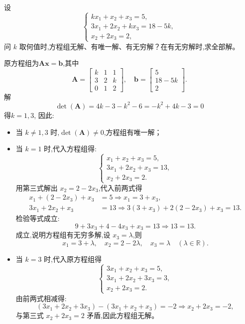 \begin{questions}
    \question 设
    \[
    \begin{cases}
    k x_1 + x_2 + x_3 = 5, \\
    3 x_1 + 2 x_2 + k x_3 = 18 - 5k, \\
    x_2 + 2 x_3 = 2,
    \end{cases}
    \]
    问 $k$ 取何值时,方程组无解、有唯一解、有无穷解？在有无穷解时,求全部解。
    \begin{solution}
        原方程组为$ \mathbf{A} \mathbf{x}=\mathbf{b}$,其中
        \[
        \mathbf{A} = \begin{bmatrix}
        k & 1 & 1 \\
        3 & 2 & k \\
        0 & 1 & 2
        \end{bmatrix},
        \quad
        \mathbf{b} = \begin{bmatrix} 5 \\ 18 - 5k \\ 2 \end{bmatrix}.
        \]
        解
        \[
        \det(\mathbf{A}) = 4k-3-k^2-6= -k^2 + 4k - 3 = 0
        \]
        得$k=1,3$, 因此:
        \begin{itemize}
        \item 当 $k \ne 1, 3$ 时,$\det(\mathbf{A}) \ne 0$,方程组有唯一解；
        \item 当 $k = 1$ 时,代入方程组得:
        \[
        \begin{cases}
        x_1 + x_2 + x_3 = 5, \\
        3x_1 + 2x_2 + x_3 = 13, \\
        x_2 + 2x_3 = 2.
        \end{cases}
        \]
        用第三式解出 $x_2 = 2 - 2x_3$,代入前两式得
        \begin{align*}
        x_1 + (2 - 2x_3) + x_3 &= 5 \Rightarrow x_1 = 3 + x_3, \\
        3x_1 + 2x_2 + x_3 &= 13 \Rightarrow 3(3 + x_3) + 2(2 - 2x_3) + x_3 = 13.
        \end{align*}
        检验等式成立:
        \[
        9 + 3x_3 + 4 - 4x_3 + x_3 = 13 \Rightarrow 13 = 13.
        \]
        成立,说明方程组有无穷多解,设 $x_3 = \lambda$,则
        \[
        x_1 = 3 + \lambda, \quad
        x_2 = 2 - 2\lambda, \quad
        x_3 = \lambda \quad (\lambda \in \mathbb{R}).
        \]
        \item 当 $k = 3$ 时,代入原方程组得
        \[
        \begin{cases}
        3x_1 + x_2 + x_3 = 5, \\
        3x_1 + 2x_2 + 3x_3 = 3, \\
        x_2 + 2x_3 = 2.
        \end{cases}
        \]
        由前两式相减得:
        \[
        (3x_1 + 2x_2 + 3x_3) - (3x_1 + x_2 + x_3) = -2 \Rightarrow x_2 + 2x_3 = -2,
        \]
        与第三式 $x_2 + 2x_3 = 2$ 矛盾,因此方程组无解。
        \end{itemize}
    \end{solution}


\end{questions}
